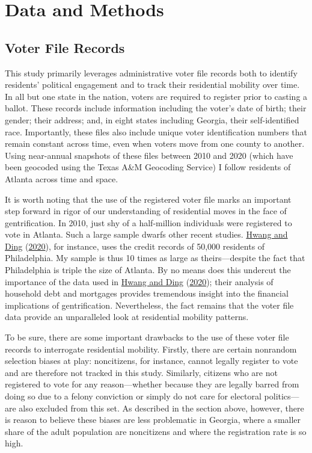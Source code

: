 \documentclass[
  12pt,
]{article}
\begin{document}
\hypertarget{data-and-methods}{%
\section*{Data and Methods}\label{data-and-methods}}

\hypertarget{voter-file-records}{%
\subsection*{Voter File Records}\label{voter-file-records}}

This study primarily leverages administrative voter file records both to identify residents' political engagement and to track their residential mobility over time. In all but one state in the nation, voters are required to register prior to casting a ballot. These records include information including the voter's date of birth; their gender; their address; and, in eight states including Georgia, their self-identified race. Importantly, these files also include unique voter identification numbers that remain constant across time, even when voters move from one county to another. Using near-annual snapshots of these files between 2010 and 2020 (which have been geocoded using the Texas A\&M Geocoding Service) I follow residents of Atlanta across time and space.

It is worth noting that the use of the registered voter file marks an important step forward in rigor of our understanding of residential moves in the face of gentrification. In 2010, just shy of a half-million individuals were registered to vote in Atlanta. Such a large sample dwarfs other recent studies. \protect\hyperlink{ref-Hwang2020}{Hwang and Ding} (\protect\hyperlink{ref-Hwang2020}{2020}), for instance, uses the credit records of 50,000 residents of Philadelphia. My sample is thus 10 times as large as theirs---despite the fact that Philadelphia is triple the size of Atlanta. By no means does this undercut the importance of the data used in \protect\hyperlink{ref-Hwang2020}{Hwang and Ding} (\protect\hyperlink{ref-Hwang2020}{2020}); their analysis of household debt and mortgages provides tremendous insight into the financial implications of gentrification. Nevertheless, the fact remains that the voter file data provide an unparalleled look at residential mobility patterns.

To be sure, there are some important drawbacks to the use of these voter file records to interrogate residential mobility. Firstly, there are certain nonrandom selection biases at play: noncitizens, for instance, cannot legally register to vote and are therefore not tracked in this study. Similarly, citizens who are not registered to vote for any reason---whether because they are legally barred from doing so due to a felony conviction or simply do not care for electoral politics---are also excluded from this set. As described in the section above, however, there is reason to believe these biases are less problematic in Georgia, where a smaller share of the adult population are noncitizens and where the registration rate is so high.
\end{document}
